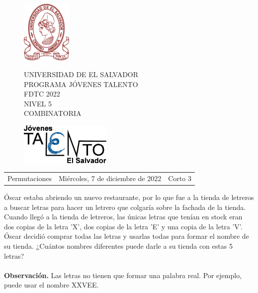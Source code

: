 \documentclass[12pt]{article}
\newcommand{\tema}{Permutaciones}
\newcommand{\fecha}{Miércoles, 7 de diciembre de 2022}
\newcommand{\sesion}{Corto 3}
\begin{document}
\thispagestyle{empty}

\begin{figure}[h] 
	\begin{minipage}[b]{0.26\textwidth}
		\begin{center}
			\includegraphics[height=3cm]{Logos/UES.png}
			\par\end{center}
	\end{minipage} 
	\begin{minipage}[b]{0.46\textwidth}
		\begin{center}
			UNIVERSIDAD DE EL SALVADOR\\ [0.1cm]
			PROGRAMA JÓVENES TALENTO\\ [0.1cm]
	        FDTC 2022\\ [0.1cm]
                NIVEL 5\\ [0.1cm]
			COMBINATORIA 
			\par\end{center}
	\end{minipage} 
	\begin{minipage}[b]{0.05\textwidth}
		\begin{center}
			\includegraphics[height=2cm]{Logos/LOGO PJT.png}
			\par\end{center}
	\end{minipage}
\end{figure}

\begin{center}
    \begin{tabular}{p{4.5cm} p{7cm} p{4.5cm}}
        \tema & \centering\fecha & \hfill\sesion
    \end{tabular}
\end{center}

\begin{problema}
Óscar estaba abriendo un nuevo restaurante, por lo que fue a la tienda de letreros a buscar letras para hacer un letrero que colgaría sobre la fachada de la tienda. Cuando llegó a la tienda de letreros, las únicas letras que tenían en stock eran dos copias de la letra 'X', dos copias de la letra 'E' y una copia de la letra 'V'. Óscar decidió comprar todas las letras y usarlas todas para formar el nombre de su tienda. ¿Cuántos nombres diferentes puede darle a su tienda con estas 5 letras?\\\\
{\small \textbf{Observación.}
Las letras no tienen que formar una palabra real. Por ejemplo, puede usar el nombre XXVEE.}
\end{problema}
\end{document}
